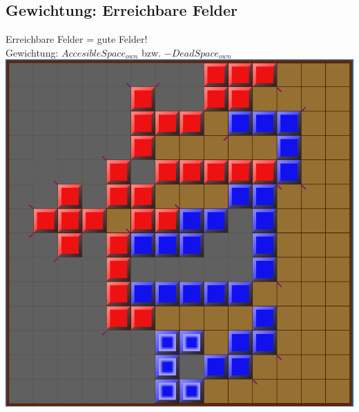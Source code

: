 \documentclass[12pt]{beamer}
\begin{document}
\subsection{Gewichtung: Erreichbare Felder}
\begin{frame}
	Erreichbare Felder = gute Felder!\\
	\pause
	Gewichtung: $AccesibleSpace_{own}$ bzw. $- DeadSpace_{own}$
	\pause
	\includegraphics[width=0.6\linewidth]{media/wgh15.png}
\end{frame}
\end{document}
